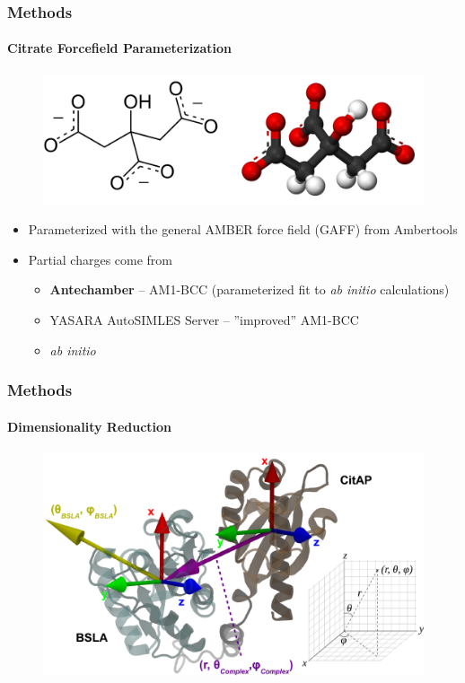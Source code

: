 \documentclass[english]{beamer}
\begin{document}

\begin{frame}
    \frametitle{Methods}
    \framesubtitle{Citrate Forcefield Parameterization}

    \begin{figure}
        \includegraphics[width=.7\linewidth]{figures/citrate.png}
    \end{figure}      

    \begin{itemize}
        \item Parameterized with the general AMBER force field (GAFF) from Ambertools
        \item Partial charges come from
        \begin{itemize}
            \item \textbf{Antechamber} -- AM1-BCC (parameterized fit to \textit{ab initio} calculations)
            \item YASARA AutoSIMLES Server -- ''improved'' AM1-BCC
            \item \textit{ab initio}
        \end{itemize}
    \end{itemize}
\end{frame}   


\begin{frame}
    \frametitle{Methods}
    \framesubtitle{Dimensionality Reduction}

    \begin{figure}
        \includegraphics[width=1.0\textwidth]{figures/Collective_coords/collective_coords.pdf}
    \end{figure}        

\end{frame}     
 
\end{document}
